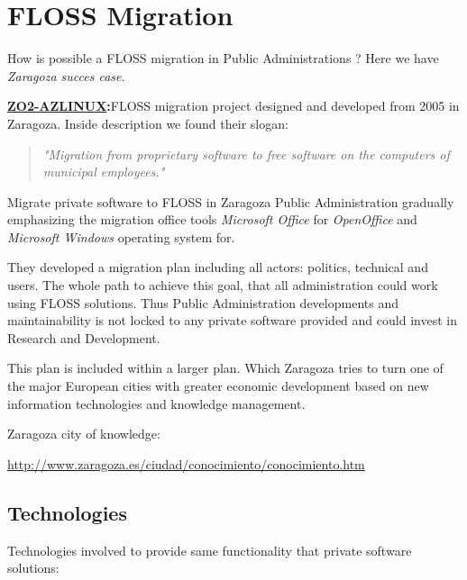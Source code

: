 \section{FLOSS Migration}
\label{sec:floss-migration}

\par How is possible a FLOSS migration in Public Administrations ? Here we have \textit{Zaragoza succes case}.

\par \textbf{\href{http://www.zaragoza.es/ciudad/sectores/tecnologia/swlibre/proyecto.htm}{ZO2-AZLINUX}:}FLOSS migration project designed and developed from 2005 in Zaragoza. Inside description we found their slogan:

\begin{quote}
    \textit{"Migration from proprietary software to free software on the computers of municipal employees."}
\end{quote}

\par Migrate private software to FLOSS in Zaragoza Public Administration gradually emphasizing the migration office tools \textit{Microsoft Office} for \textit{OpenOffice} and \textit{Microsoft Windows} operating system for.

\par They developed a migration plan including all actors: politics, technical and users. The whole path to achieve this goal, that all administration could work using FLOSS solutions. Thus Public Administration developments and maintainability is not locked to any private software provided and could invest in Research and Development.

\par This plan is included within a larger plan. Which Zaragoza tries to turn one of the major European cities with greater economic development based on new information technologies and knowledge management.

\par Zaragoza city of knowledge:

\par \url{http://www.zaragoza.es/ciudad/conocimiento/conocimiento.htm}

\subsection{Technologies}

\par Technologies involved to provide same functionality that private software solutions:

